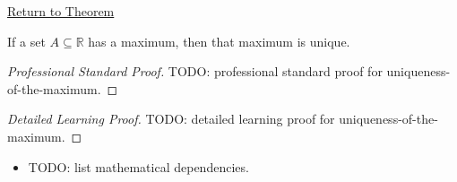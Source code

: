 \newpage
{}
\label{prf:uniqueness-of-the-maximum}

\begin{remark*}[Return]
\hyperref[prop:uniqueness-of-the-maximum]{Return to Theorem}
\end{remark*}

\begin{proposition*}
If a set $A \subseteq \mathbb{R}$ has a maximum, then that maximum is unique.
\end{proposition*}

\begin{proof}[Professional Standard Proof]
\LRAProofBodyStart
TODO: professional standard proof for uniqueness-of-the-maximum.
\end{proof}

\begin{proof}[Detailed Learning Proof]
\LRAProofBodyStart
TODO: detailed learning proof for uniqueness-of-the-maximum.
\end{proof}

\begin{remark*}
\end{remark*}

\begin{dependencies}
\begin{itemize}
  \item TODO: list mathematical dependencies.
\end{itemize}
\end{dependencies}

\clearpage
